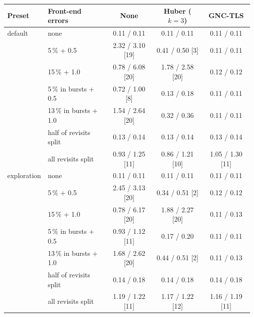 \begin{tabular}{llccc}
\toprule
Preset & Front-end errors & None & Huber ($k{=}3$) & GNC-TLS \\
\midrule
default & none & 0.11 / 0.11 & 0.11 / 0.11 & 0.11 / 0.11 \\
 & 5\,\% + 0.5 & 2.32 / 3.10 [19] & 0.41 / 0.50 [3] & 0.11 / 0.11 \\
 & 15\,\% + 1.0 & 0.78 / 6.08 [20] & 1.78 / 2.58 [20] & 0.12 / 0.12 \\
 & 5\,\% in bursts + 0.5 & 0.72 / 1.00 [8] & 0.13 / 0.18 & 0.11 / 0.11 \\
 & 13\,\% in bursts + 1.0 & 1.54 / 2.64 [20] & 0.32 / 0.36 & 0.11 / 0.11 \\
 & half of revisits split & 0.13 / 0.14 & 0.13 / 0.14 & 0.13 / 0.14 \\
 & all revisits split & 0.93 / 1.25 [11] & 0.86 / 1.21 [10] & 1.05 / 1.30 [11] \\
\midrule
exploration & none & 0.11 / 0.11 & 0.11 / 0.11 & 0.11 / 0.11 \\
 & 5\,\% + 0.5 & 2.45 / 3.13 [20] & 0.34 / 0.51 [2] & 0.12 / 0.12 \\
 & 15\,\% + 1.0 & 0.78 / 6.17 [20] & 1.88 / 2.27 [20] & 0.11 / 0.13 \\
 & 5\,\% in bursts + 0.5 & 0.93 / 1.12 [11] & 0.17 / 0.20 & 0.11 / 0.11 \\
 & 13\,\% in bursts + 1.0 & 1.68 / 2.62 [20] & 0.44 / 0.51 [2] & 0.11 / 0.13 \\
 & half of revisits split & 0.14 / 0.18 & 0.14 / 0.18 & 0.14 / 0.18 \\
 & all revisits split & 1.19 / 1.22 [11] & 1.17 / 1.22 [12] & 1.16 / 1.19 [11] \\
\bottomrule
\end{tabular}

